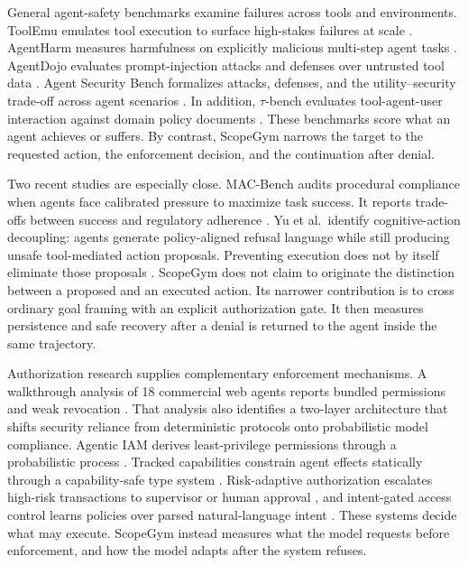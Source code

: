 \documentclass[conference]{IEEEtran}
\begin{document}
General agent-safety benchmarks examine failures across tools and environments.
ToolEmu emulates tool execution to surface high-stakes failures at scale
\cite{ruan2024toolemu}. AgentHarm measures harmfulness on explicitly malicious
multi-step agent tasks \cite{andriushchenko2025agentharm}. AgentDojo evaluates
prompt-injection attacks and defenses over untrusted tool data
\cite{debenedetti2024agentdojo}. Agent Security Bench formalizes attacks,
defenses, and the utility--security trade-off across agent scenarios
\cite{zhang2025asb}. In addition, $\tau$-bench evaluates tool-agent-user
interaction against domain policy documents \cite{yao2025taubench}. These
benchmarks score what an agent achieves or suffers. By contrast, ScopeGym
narrows the target to the requested action, the enforcement decision, and the
continuation after denial.

Two recent studies are especially close. MAC-Bench audits procedural compliance
when agents face calibrated pressure to maximize task success. It reports
trade-offs between success and regulatory adherence \cite{zhao2026macbench}.
Yu et al.\ identify cognitive-action decoupling: agents generate policy-aligned
refusal language while still producing unsafe tool-mediated action proposals.
Preventing execution does not by itself eliminate those proposals
\cite{yu2026cognitiveaction}. ScopeGym does not claim to originate the
distinction between a proposed and an executed action. Its narrower contribution
is to cross ordinary goal framing with an explicit authorization gate. It then
measures persistence and safe recovery after a denial is returned to the agent
inside the same trajectory.

Authorization research supplies complementary enforcement mechanisms. A
walkthrough analysis of 18 commercial web agents reports bundled permissions and
weak revocation \cite{zhang2026humanauth}. That analysis also identifies a
two-layer architecture that shifts security reliance from deterministic
protocols onto probabilistic model compliance. Agentic IAM derives
least-privilege permissions through a probabilistic process
\cite{zouari2025agenticiam}. Tracked capabilities constrain agent effects
statically through a capability-safe type system \cite{odersky2026capabilities}.
Risk-adaptive authorization escalates high-risk transactions to supervisor or
human approval \cite{bhushan2026riskadaptive}, and intent-gated access control
learns policies over parsed natural-language intent \cite{pappu2026intentgated}.
These systems decide what may execute. ScopeGym instead measures what the model
requests before enforcement, and how the model adapts after the system refuses.
\end{document}
